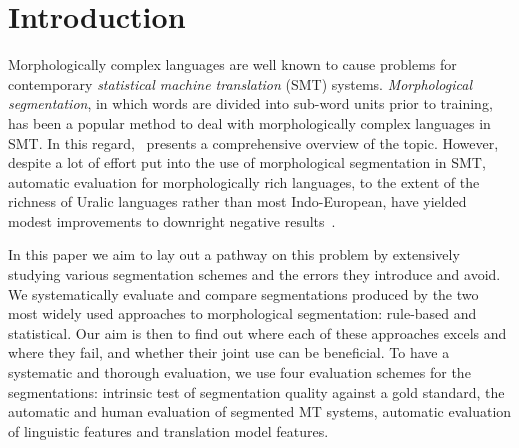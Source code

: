 \documentclass[free]{flammie}
\begin{document}

\section{Introduction}



Morphologically complex languages are well known to cause problems for contemporary \textit{statistical machine translation} (SMT) systems.
\textit{Morphological segmentation}, in which words are divided into sub-word units prior to training, 
has been a popular method to deal with morphologically complex languages in SMT. 
In this regard,~\cite{clifton2010unsupervised} presents a comprehensive overview of the topic.
However, despite a lot of effort put into the use of morphological segmentation in SMT, automatic evaluation for morphologically rich languages, to the extent of the richness of Uralic languages rather than most Indo-European, have yielded modest improvements to downright negative results~\cite{virpioja2007morphology}.


In this paper we aim to lay out a pathway on this problem by extensively studying various segmentation schemes and the errors they introduce and avoid.
We systematically evaluate and compare segmentations produced by the two most widely used approaches to morphological segmentation: rule-based and statistical.
Our aim is then to find out where each of these approaches excels and where they fail, and whether their joint use can be beneficial.
To have a systematic and thorough evaluation, we use four evaluation schemes for the segmentations: intrinsic test of segmentation quality against a gold standard, the automatic and human evaluation of segmented MT systems, automatic evaluation of linguistic features and translation model features.

\end{document}
